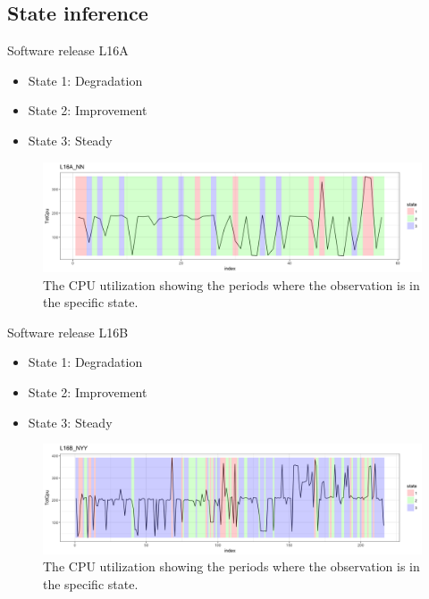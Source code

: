 \documentclass{beamer}
\begin{document}
\subsection{State inference}
\begin{frame}
Software release L16A

\begin{itemize}
	\item State 1: Degradation
	\item State 2: Improvement
	\item State 3: Steady
\end{itemize}

\begin{figure}
	\includegraphics[width=1\linewidth]{L16A_NN1}
	\caption{The CPU utilization showing the periods where the observation is in the specific state.}
\end{figure}

\end{frame}

\begin{frame}
Software release L16B

\begin{itemize}
	\item State 1: Degradation
	\item State 2: Improvement
	\item State 3: Steady
\end{itemize}

\begin{figure}
	\includegraphics[width=1\linewidth]{L16B_NYY1}
	\caption{The CPU utilization showing the periods where the observation is in the specific state.}
\end{figure}

\end{frame}
\end{document}
